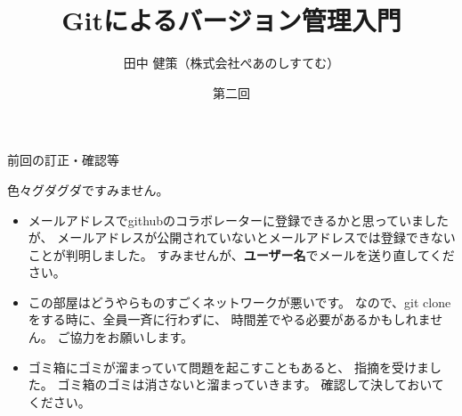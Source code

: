 \documentclass[12pt, unicode]{beamer}
\title{Gitによるバージョン管理入門}
\author{田中 健策（株式会社ぺあのしすてむ）}
\date[2019/10/04]{第二回}
\begin{document}
\frame{\maketitle}

\begin{frame}{前回の訂正・確認等}

色々グダグダですみません。

\begin{itemize}
\item メールアドレスでgithubのコラボレーターに登録できるかと思っていましたが、
メールアドレスが公開されていないとメールアドレスでは登録できないことが判明しました。
すみませんが、\textbf{ユーザー名}でメールを送り直してください。

\item この部屋はどうやらものすごくネットワークが悪いです。
なので、git cloneをする時に、全員一斉に行わずに、
時間差でやる必要があるかもしれません。
ご協力をお願いします。

\item ゴミ箱にゴミが溜まっていて問題を起こすこともあると、
指摘を受けました。
ゴミ箱のゴミは消さないと溜まっていきます。
確認して決しておいてください。

\end{itemize}

\end{frame}
\end{document}
